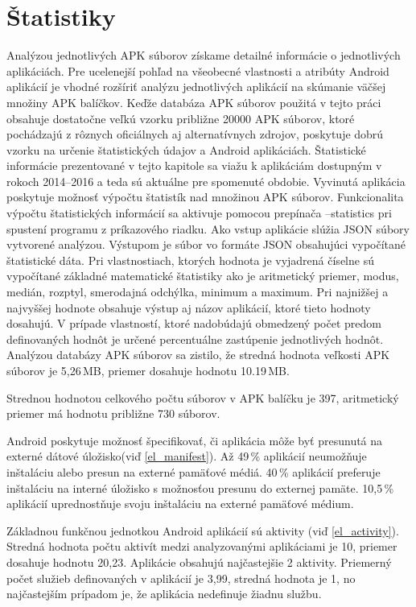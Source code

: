 \chapter{Štatistiky}
Analýzou jednotlivých APK súborov získame detailné informácie o jednotlivých aplikáciách. Pre ucelenejší pohľad na všeobecné vlastnosti a atribúty Android aplikácií je vhodné rozšíriť analýzu jednotlivých aplikácií na skúmanie väčšej množiny APK balíčkov. Keďže databáza APK súborov použitá v tejto práci obsahuje dostatočne veľkú vzorku približne 20000 APK súborov, ktoré pochádzajú z rôznych oficiálnych aj alternatívnych zdrojov, poskytuje dobrú vzorku na určenie štatistických údajov a Android aplikáciách. Štatistické informácie prezentované v tejto kapitole sa viažu k aplikáciám dostupným v rokoch 2014--2016 a teda sú aktuálne pre spomenuté obdobie.
Vyvinutá aplikácia  poskytuje možnosť výpočtu štatistík nad množinou APK súborov. Funkcionalita výpočtu štatistických informácií sa aktivuje pomocou prepínača –statistics pri spustení programu z príkazového riadku. Ako vstup aplikácie slúžia JSON súbory vytvorené analýzou. Výstupom je súbor vo formáte JSON obsahujúci vypočítané štatistické dáta. Pri vlastnostiach, ktorých hodnota je vyjadrená číselne sú vypočítané základné matematické štatistiky ako je aritmetický priemer, modus, medián, rozptyl, smerodajná odchýlka, minimum a maximum. Pri najnižšej a najvyššej hodnote obsahuje výstup aj názov aplikácií, ktoré tieto hodnoty dosahujú. V prípade vlastností, ktoré nadobúdajú obmedzený počet predom definovaných hodnôt je určené percentuálne zastúpenie jednotlivých hodnôt.
Analýzou databázy APK súborov sa zistilo, že stredná hodnota veľkosti APK súborov je 5,26\,MB, priemer dosahuje hodnotu 10.19\,MB.

Strednou hodnotou celkového počtu súborov v APK balíčku je 397, aritmetický priemer má hodnotu približne 730 súborov. 

Android poskytuje možnosť špecifikovať, či aplikácia môže byť presunutá na externé dátové úložisko(viď \ref{el_manifest}). Až 49\,\% aplikácií neumožňuje inštaláciu alebo presun na externé pamäťové médiá.  40\,\% aplikácií preferuje inštaláciu na interné úložisko s možnosťou presunu do externej pamäte. 10,5\,\% aplikácií uprednostňuje svoju inštaláciu na externé pamäťové médium.

Základnou funkčnou jednotkou Android aplikácií sú aktivity (viď \ref{el_activity}). Stredná hodnota počtu aktivít medzi analyzovanými aplikáciami je  10, priemer dosahuje hodnotu 20,23. Aplikácie obsahujú najčastejšie 2 aktivity. Priemerný počet služieb definovaných v aplikácií je 3,99, stredná hodnota je 1, no najčastejším prípadom je, že aplikácia nedefinuje žiadnu službu.


